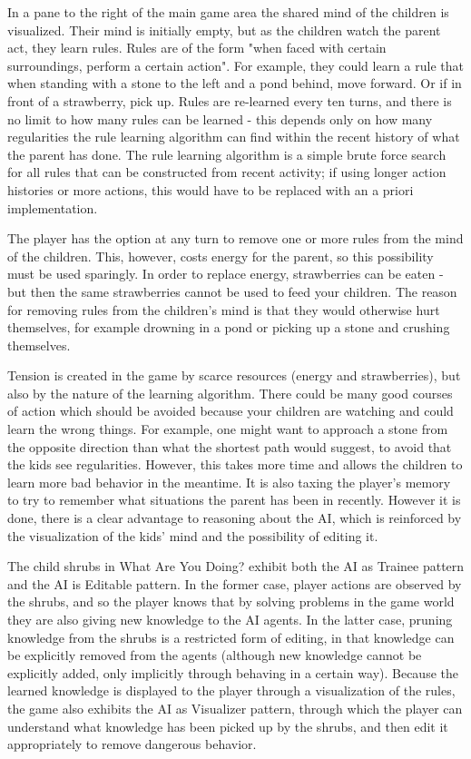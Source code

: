 \documentclass{sig-alternate}
\begin{document}
In a pane to the right of the main game area the shared mind of the
children is visualized. Their mind is initially empty, but as the
children watch the parent act, they learn rules. Rules are of the
form "when faced with certain surroundings, perform a certain
action". For example, they could learn a rule that when standing
with a stone to the left and a pond behind, move forward. Or if in
front of a strawberry, pick up. Rules are re-learned every ten
turns, and there is no limit to how many rules can be learned - this
depends only on how many regularities the rule learning
algorithm can find within the recent history of what the parent has
done. The rule learning algorithm is a simple brute force search
for all rules that can be constructed from recent activity; if using
longer action histories or more actions, this would have to be
replaced with an a priori implementation.

The player has the option at any turn to remove one or more rules
from the mind of the children. This, however, costs energy for the
parent, so this possibility must be used sparingly. In order to
replace energy, strawberries can be eaten - but then the same
strawberries cannot be used to feed your children. The reason for
removing rules from the children’s mind is that they would
otherwise hurt themselves, for example drowning in a pond or
picking up a stone and crushing themselves.

Tension is created in the game by scarce resources (energy and
strawberries), but also by the nature of the learning algorithm.
There could be many good courses of action which should be
avoided because your children are watching and could learn the
wrong things. For example, one might want to approach a stone
from the opposite direction than what the shortest path would
suggest, to avoid that the kids see regularities. However, this takes
more time and allows the children to learn more bad behavior in
the meantime. It is also taxing the player's memory to try to
remember what situations the parent has been in recently.
However it is done, there is a clear advantage to reasoning about
the AI, which is reinforced by the visualization of the kids' mind
and the possibility of editing it.

The child shrubs in What Are You Doing? exhibit both the AI as
Trainee pattern and the AI is Editable pattern. In the former case,
player actions are observed by the shrubs, and so the player knows
that by solving problems in the game world they are also giving
new knowledge to the AI agents. In the latter case, pruning
knowledge from the shrubs is a restricted form of editing, in that
knowledge can be explicitly removed from the agents (although
new knowledge cannot be explicitly added, only implicitly
through behaving in a certain way). Because the learned
knowledge is displayed to the player through a visualization of the
rules, the game also exhibits the AI as Visualizer pattern, through
which the player can understand what knowledge has been picked
up by the shrubs, and then edit it appropriately to remove
dangerous behavior.
\end{document}

